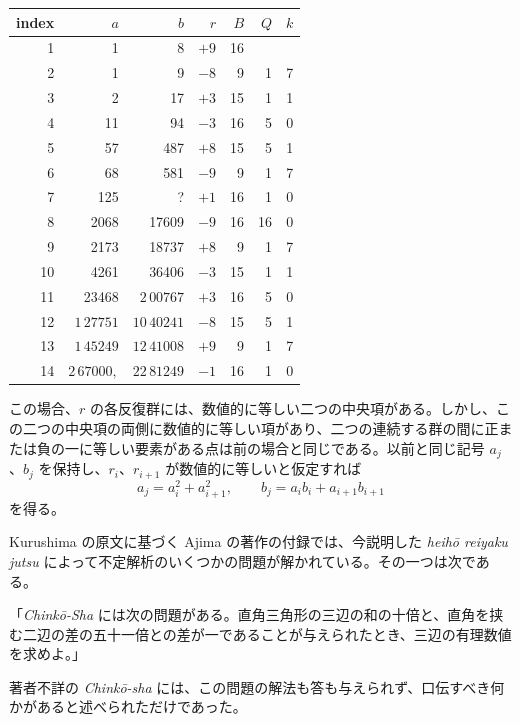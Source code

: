 \documentclass[11pt]{article}
\newcommand{\scanfooter}{}
\begin{document}
\begin{center}
\small
\begin{tabular}{|r|r|r|r|r|r|r|}
\hline
index & $a$ & $b$ & $r$ & $B$ & $Q$ & $k$\\
\hline
1  & 1          & 8          & $+9$ & 16 &   &  \\
2  & 1          & 9          & $-8$ & 9  & 1 & 7\\
3  & 2          & 17         & $+3$ & 15 & 1 & 1\\
4  & 11         & 94         & $-3$ & 16 & 5 & 0\\
5  & 57         & 487        & $+8$ & 15 & 5 & 1\\
6  & 68         & 581        & $-9$ & 9  & 1 & 7\\
7  & 125        & ?          & $+1$ & 16 & 1 & 0\\
8  & 2068       & 17609      & $-9$ & 16 & 16& 0\\
9  & 2173       & 18737      & $+8$ & 9  & 1 & 7\\
10 & 4261       & 36406      & $-3$ & 15 & 1 & 1\\
11 & 23468      & $2\,00767$ & $+3$ & 16 & 5 & 0\\
12 & $1\,27751$ & $10\,40241$& $-8$ & 15 & 5 & 1\\
13 & $1\,45249$ & $12\,41008$& $+9$ & 9  & 1 & 7\\
14 & $2\,67000,$& $22\,81249$& $-1$ & 16 & 1 & 0\\
\end{tabular}
\end{center}

この場合、$r$ の各反復群には、数値的に等しい二つの中央項がある。しかし、この二つの中央項の両側に数値的に等しい項があり、二つの連続する群の間に正または負の一に等しい要素がある点は前の場合と同じである。以前と同じ記号 $a_j$、$b_j$ を保持し、$r_i$、$r_{i+1}$ が数値的に等しいと仮定すれば
\[
a_j=a_i^2+a_{i+1}^2,\qquad b_j=a_ib_i+a_{i+1}b_{i+1}
\]
を得る。

Kurushima の原文に基づく Ajima の著作の付録では、今説明した \emph{heihō reiyaku jutsu} によって不定解析のいくつかの問題が解かれている。その一つは次である。

「\emph{Chinkō-Sha} には次の問題がある。直角三角形の三辺の和の十倍と、直角を挟む二辺の差の五十一倍との差が一であることが与えられたとき、三辺の有理数値を求めよ。」

著者不詳の \emph{Chinkō-sha} には、この問題の解法も答も与えられず、口伝すべき何かがあると述べられただけであった。
\scanfooter
\end{document}
